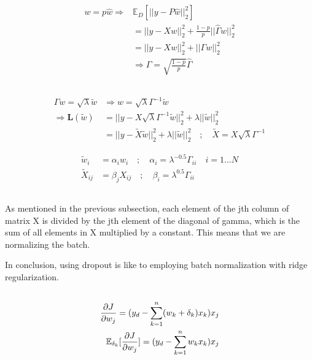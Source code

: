 \documentclass{article}
\newcommand*{\ex}[1]{
    \mathbb{E}_{#1}
}
\begin{document}
\subsection{}
\begin{align*}
    w = p\hat{w} \Rightarrow
    &\ex{D}[||y - P\hat{w}||_2 ^ 2] \\
    &= ||y - Xw||_2^2 + \frac{1 - p}{p}||\hat{\Gamma}w||_2^2 \\
    &= ||y - Xw||_2^2 + ||\Gamma w||_2^2 \\
    &\Rightarrow \Gamma = \sqrt{\frac{1 - p}{p}} \hat{\Gamma}
\end{align*}


\subsection{}
\begin{align*}
    \Gamma w = \sqrt{\lambda}\tilde{w} &\Rightarrow w = \sqrt{\lambda} \Gamma^{-1} \tilde{w} \\
    \Rightarrow \mathbf{L}(\tilde{w}) 
    &= ||y - X\sqrt{\lambda} \Gamma^{-1} \tilde{w}||_2^2
    + \lambda ||\tilde{w}||_2^2 \\
    &= ||y-\tilde{X}\tilde{w}||_2^2 + \lambda ||\tilde{w}||_2^2 \quad ; \quad \tilde{X} = X\sqrt{\lambda} \Gamma^{-1}
\end{align*}

\begin{align*}
    \tilde{w}_i &= \alpha_i w_i \quad ; \quad \alpha_i = \lambda^{-0.5}\Gamma_{ii} \quad i = 1 \dots N \\
    \tilde{X}_{ij} &= \beta_j X_{ij} \quad ; \quad \beta_i = \lambda^{0.5}\Gamma_{ii}
\end{align*}


\subsection{}
As mentioned in the previous subsection, each element of the jth column 
of matrix X is divided by the jth element of the diagonal of gamma, which
is the sum of all elements in X multiplied by a constant. This means that
we are normalizing the batch.

In conclusion, using dropout is like to employing batch normalization with 
ridge regularization.


\subsection{}
\begin{align*}
    \pdv{J}{w_j} = (y_d - \sum_{k=1}^{n}(w_k + \delta_k)x_k)x_j \\
    \ex{\delta_k}[\pdv{J}{w_j}] = (y_d - \sum_{k=1}^{n}w_kx_k)x_j
\end{align*}
\end{document}
